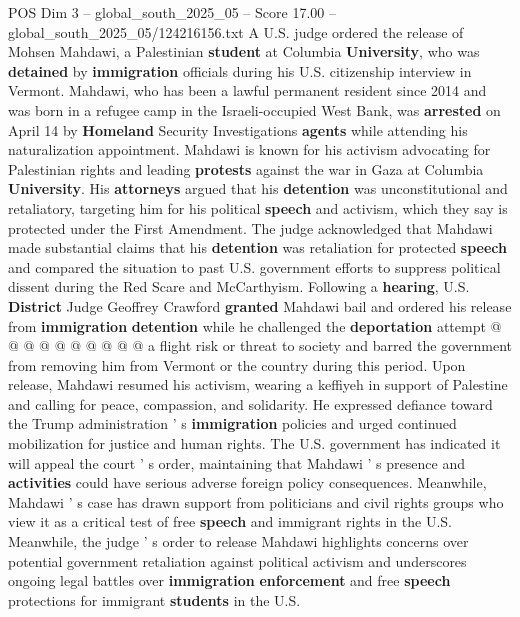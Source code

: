 \begin{textsample}{POS Dim 3 – global\_south\_2025\_05 – Score 17.00 – global\_south\_2025\_05/124216156.txt}  \label{ex:f3_pos_285}
A U.S. judge ordered the release of Mohsen Mahdawi, a Palestinian \textbf{student} at Columbia \textbf{University}, who was \textbf{detained} by \textbf{immigration} officials during his U.S. citizenship interview in Vermont.
Mahdawi, who has been a lawful permanent resident since 2014 and was born in a refugee camp in the Israeli-occupied West Bank, was \textbf{arrested} on April 14 by \textbf{Homeland} Security Investigations \textbf{agents} while attending his naturalization appointment.
Mahdawi is known for his activism advocating for Palestinian rights and leading \textbf{protests} against the war in Gaza at Columbia \textbf{University}.
His \textbf{attorneys} argued that his \textbf{detention} was unconstitutional and retaliatory, targeting him for his political \textbf{speech} and activism, which they say is protected under the First Amendment.
The judge acknowledged that Mahdawi made substantial claims that his \textbf{detention} was retaliation for protected \textbf{speech} and compared the situation to past U.S. government efforts to suppress political dissent during the Red Scare and McCarthyism.
Following a \textbf{hearing}, U.S. \textbf{District} Judge Geoffrey Crawford \textbf{granted} Mahdawi bail and ordered his release from \textbf{immigration} \textbf{detention} while he challenged the \textbf{deportation} attempt @ @ @ @ @ @ @ @ @ @ a flight risk or threat to society and barred the government from removing him from Vermont or the country during this period.
Upon release, Mahdawi resumed his activism, wearing a keffiyeh in support of Palestine and calling for peace, compassion, and solidarity.
He expressed defiance toward the Trump administration ' s \textbf{immigration} policies and urged continued mobilization for justice and human rights.
The U.S. government has indicated it will appeal the court ' s order, maintaining that Mahdawi ' s presence and \textbf{activities} could have serious adverse foreign policy consequences.
Meanwhile, Mahdawi ' s case has drawn support from politicians and civil rights groups who view it as a critical test of free \textbf{speech} and immigrant rights in the U.S.
Meanwhile, the judge ' s order to release Mahdawi highlights concerns over potential government retaliation against political activism and underscores ongoing legal battles over \textbf{immigration} \textbf{enforcement} and free \textbf{speech} protections for immigrant \textbf{students} in the U.S.

\end{textsample}
